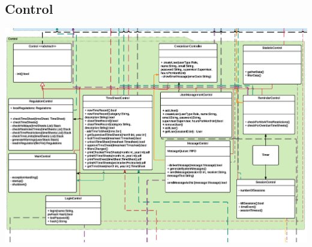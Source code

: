     \subsection{Control}
        \includegraphics[width=\linewidth]{Diagramms/class/control.pdf}\\
        \newpage
